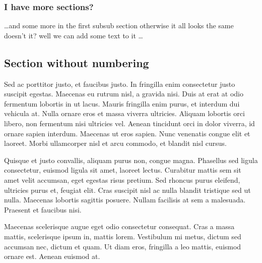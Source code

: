 \documentclass[11pt]{article}
\begin{document}
\subsubsection{I have more sections?} %
\dots and some more in the first subsub section otherwise it all looks the same
doesn't it? well we can add some text to it \dots

\subsection*{Section without numbering} %

Sed ac porttitor justo, et faucibus justo. In fringilla enim consectetur justo 
suscipit egestas. Maecenas eu rutrum nisl, a gravida nisi. Duis at erat at odio 
fermentum lobortis in ut lacus. Mauris fringilla enim purus, et interdum dui 
vehicula at. Nulla ornare eros et massa viverra ultricies. Aliquam lobortis 
orci libero, non fermentum nisi ultricies vel. Aenean tincidunt orci in dolor 
viverra, id ornare sapien interdum. Maecenas ut eros sapien. Nunc venenatis 
congue elit et laoreet. Morbi ullamcorper nisl et arcu commodo, et blandit nisl 
cursus.

Quisque et justo convallis, aliquam purus non, congue magna. Phasellus sed 
ligula consectetur, euismod ligula sit amet, laoreet lectus. Curabitur mattis 
sem sit amet velit accumsan, eget egestas risus pretium. Sed rhoncus purus 
eleifend, ultricies purus et, feugiat elit. Cras suscipit nisl ac nulla blandit 
tristique sed ut nulla. Maecenas lobortis sagittis posuere. Nullam facilisis at 
sem a malesuada. Praesent et faucibus nisi.

Maecenas scelerisque augue eget odio consectetur consequat. Cras a massa 
mattis, scelerisque ipsum in, mattis lorem. Vestibulum mi metus, dictum sed 
accumsan nec, dictum et quam. Ut diam eros, fringilla a leo mattis, euismod 
ornare est. Aenean euismod at. 
\end{document}
